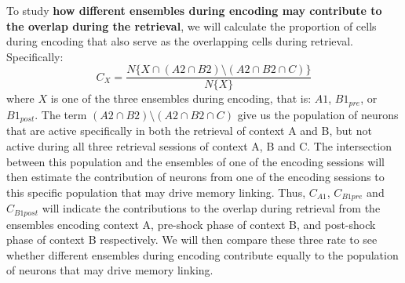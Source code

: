 \documentclass[master.tex]{subfiles}
\begin{document}
To study \textbf{how different ensembles during encoding may contribute to the
  overlap during the retrieval}, we will calculate the proportion of cells
during encoding that also serve as the overlapping cells during retrieval.
Specifically:
\begin{displaymath}
  C_{X} = \frac{N\{X \cap (A2 \cap B2) \setminus (A2 \cap B2 \cap C)\}}{N\{X\}}
\end{displaymath}
where $X$ is one of the three ensembles during encoding, that is: $A1$,
$B1_{pre}$, or $B1_{post}$. The term $(A2 \cap B2) \setminus (A2 \cap B2 \cap
C)$ give us the population of neurons that are active specifically in both the
retrieval of context A and B, but not active during all three retrieval sessions
of context A, B and C. The intersection between this population and the
ensembles of one of the encoding sessions will then estimate the contribution of
neurons from one of the encoding sessions to this specific population that may
drive memory linking. Thus, $C_{A1}$, $C_{B1pre}$ and $C_{B1post}$ will indicate
the contributions to the overlap during retrieval from the ensembles encoding
context A, pre-shock phase of context B, and post-shock phase of context B
respectively. We will then compare these three rate to see whether different
ensembles during encoding contribute equally to the population of neurons that
may drive memory linking.
\end{document}
